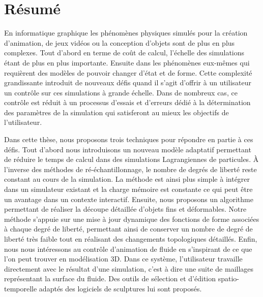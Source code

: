 
\chapter{R\'esum\'e}
En informatique graphique les phénomènes physiques simulés pour la création d'animation, de jeux vidéos ou la conception d'objets sont de plus en plus complexes. Tout d'abord en terme de coût de calcul, l'échelle des simulations étant de plus en plus importante. Ensuite dans les phénomènes eux-mêmes qui requièrent des modèles de pouvoir changer d'état et de forme. Cette complexité grandissante introduit de nouveaux défis quand il s'agit d'offrir à un utilisateur un contrôle sur ces simulations à grande échelle. Dans de nombreux cas, ce contrôle est réduit à un processus d'essais et d'erreurs dédié à la détermination des paramètres de la simulation qui satisferont au mieux les objectifs de l'utilisateur.

Dans cette thèse, nous proposons trois techniques pour répondre en partie à ces défis. Tout d'abord nous introduisons un nouveau modèle adaptatif permettant de réduire le temps de calcul dans des simulations Lagrangiennes de particules. À l'inverse des méthodes de ré-échantillonnage, le nombre de degrés de liberté reste constant au cours de la simulation. La méthode est ainsi plus simple à intégrer dans un simulateur existant et la charge mémoire est constante ce qui peut être un avantage dans un contexte interactif. Ensuite, nous proposons un algorithme permettant de réaliser la découpe détaillée d'objets fins et déformables. Notre méthode s'appuie sur une mise à jour dynamique des fonctions de forme associées à chaque degré de liberté, permettant ainsi de conserver un nombre de degré de liberté très faible tout en réalisant des changements topologiques détaillés. Enfin, nous nous intéressons au contrôle d'animation de fluide en s'inspirant de ce que l'on peut trouver en modélisation 3D. Dans ce système, l'utilisateur travaille directement avec le résultat d'une simulation, c'est à dire une suite de maillages représentant la surface du fluide. Des outils de sélection et d'édition spatio-temporelle adaptés des logiciels de sculptures lui sont proposés.
